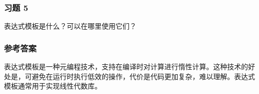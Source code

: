 \subsubsection{习题 5}

表达式模板是什么？可以在哪里使用它们？

\subsubsection{参考答案}

表达式模板是一种元编程技术，支持在编译时对计算进行惰性计算。这种技术的好处是，可避免在运行时执行低效的操作，代价是代码更加复杂，难以理解。表达式模板通常用于实现线性代数库。












